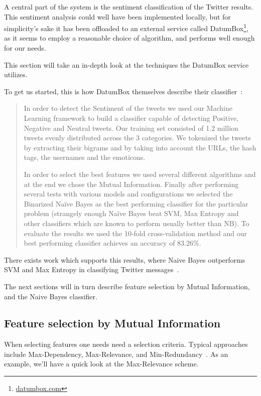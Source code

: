 A central part of the system is the sentiment classification of the Twitter results. This sentiment analysis could well have been implemented locally, but for simplicity's sake it has been offloaded to an external service called DatumBox\footnote{\url{datumbox.com}}, as it seems to employ a reasonable choice of algorithm, and performs well enough for our needs.

This section will take an in-depth look at the techniques the DatumBox service utilizes.

To get us started, this is how DatumBox themselves describe their classifier~\cite{DatumBoxTwitterSentiment}:

\begin{quote}
  In order to detect the Sentiment of the tweets we used our Machine Learning framework to build a classifier capable of detecting Positive, Negative and Neutral tweets. Our training set consisted of 1.2 million tweets evenly distributed across the 3 categories. We tokenized the tweets by extracting their bigrams and by taking into account the URLs, the hash tags, the usernames and the emoticons.

  In order to select the best features we used several different algorithms and at the end we chose the Mutual Information. Finally after performing several tests with various models and configurations we selected the Binarized Naïve Bayes as the best performing classifier for the particular problem (strangely enough Naïve Bayes beat SVM, Max Entropy and other classifiers which are known to perform usually better than NB). To evaluate the results we used the 10-fold cross-validation method and our best performing classifier achieves an accuracy of 83.26\%.
\end{quote}

There exists work which supports this results, where Naive Bayes outperforms SVM and Max Entropy in classifying Twitter messages~\cite{go2009twitter}.

The next sections will in turn describe feature selection by Mutual Information, and the Naive Bayes classifier.

\subsection{Feature selection by Mutual Information} %
\label{sub:feature_selection_by_mutual_information}

When selecting features one needs need a selection criteria. Typical approaches include Max-Dependency, Max-Relevance, and Min-Redundancy~\cite{1453511}. As an example, we'll have a quick look at the Max-Relevance scheme.

